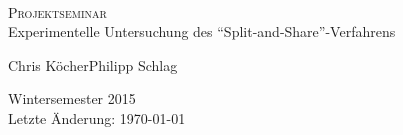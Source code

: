 \begin{titlepage}

\newcommand{\HRule}{\rule{\linewidth}{0.4pt}} %

\center %
 

\
\vspace{3.5cm}



\begin{framed}
 \vspace{0.4cm}
 \Huge \textsc{Projektseminar}\\[0.2cm]
 \normalsize Experimentelle Untersuchung des ``Split-and-Share''-Verfahrens
 \vspace{0.4cm}
\end{framed}



\begin{center}
 \large Chris Köcher\qquad\qquad Philipp Schlag\\[3cm]
\end{center}


{\large Wintersemester 2015\\\small Letzte Änderung: \today}\\[3cm] %


\end{titlepage}

